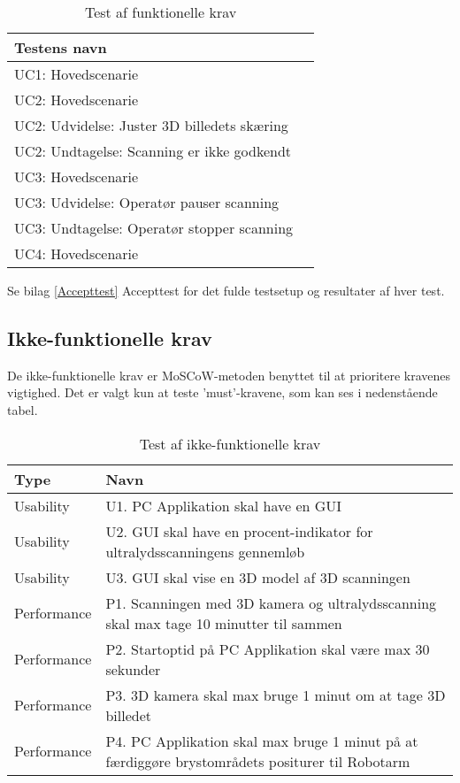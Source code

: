 \begin{table}[htb]
\centering
\begin{tabular}{ | l | p{} | } 
\hline
\textbf{Testens navn} \\\hline
UC1: Hovedscenarie\\\hline 
UC2: Hovedscenarie \\\hline 
UC2: Udvidelse: Juster 3D billedets skæring \\\hline 
UC2: Undtagelse: Scanning er ikke godkendt \\\hline 
UC3: Hovedscenarie \\\hline 
UC3: Udvidelse: Operatør pauser scanning \\\hline 
UC3: Undtagelse: Operatør stopper scanning \\\hline 
UC4: Hovedscenarie \\\hline 
\end{tabular}
\caption{Test af funktionelle krav} 
\end{table}

Se bilag \ref{Accepttest} Accepttest for det fulde testsetup og resultater af hver test. 

\subsection{Ikke-funktionelle krav} 
De ikke-funktionelle krav er MoSCoW-metoden benyttet til at prioritere kravenes vigtighed. Det er valgt kun at teste ’must’-kravene, som kan ses i nedenstående tabel. 

\begin{table}[htb]
\centering
\begin{tabular}{ | l | p{} | }
\hline
\textbf{Type} & \textbf{Navn} \\\hline
Usability & U1. PC Applikation skal have en GUI \\\hline 
Usability & U2. GUI skal have en procent-indikator for ultralydsscanningens gennemløb \\\hline
Usability & U3. GUI skal vise en 3D model af 3D scanningen \\\hline  
Performance & P1. Scanningen med 3D kamera og ultralydsscanning skal max tage 10
minutter til sammen \\\hline 
Performance & P2. Startoptid på PC Applikation skal være max 30 sekunder \\\hline
Performance & P3. 3D kamera skal max bruge 1 minut om at tage 3D billedet \\\hline 
Performance & P4. PC Applikation skal max bruge 1 minut på at færdiggøre brystområdets
positurer til Robotarm \\\hline 
\end{tabular}
\caption{Test af ikke-funktionelle krav}
\end{table}

